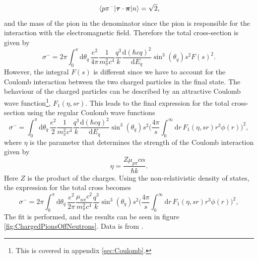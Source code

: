\begin{equation} \label{isoceffigen}
	\mel*{p\pi^-}{\bm{\mathrm{\tau}}\cdot\bm{\mathrm{\pi}}}{n} = \sqrt{2},
\end{equation}
and the mass of the pion in the denominator since the pion is responsible for the interaction with the electromagnetic field. Therefore the total cross-section is given by
\begin{equation} \label{totcross4}
	\sigma^- =  2\pi \int_0^\pi \text{d}\theta_q \, \frac{e^2}{4\pi}\frac{1}{m_\pi^2c^4}\frac{q^3}{k}\frac{\text{d}(\hbar c q)^2}{\text{d}E_q}\sin^3(\theta_q) s^2 F(s)^2.
\end{equation}
However, the integral $F(s)$ is different since we have to account for the Coulomb interaction between the two charged particles in the final state. The behaviour of the charged particles can be described by an attractive Coulomb	wave function\footnote{This is covered in appendix \ref{sec:Coulomb}.}, $F_1(\eta, sr)$. This leads to the final expression for the total cross-section using the regular Coulomb wave functions
\begin{equation} \label{totcross5}
	\sigma^- =  \int_0^\pi \text{d}\theta_q \, \frac{e^2}{2}\frac{1}{m_\pi^2c^4}\frac{q^3}{k}\frac{\text{d}(\hbar c q)^2}{\text{d}E_q}\sin^3(\theta_q) s^2 \bigg(\frac{4\pi}{s} \int_0^\infty \text{d}r \, F_1(\eta,sr)r^3\phi(r)\bigg)^2,
\end{equation}
where $\eta$ is the parameter that determines the strength of the Coulomb interaction given by
\begin{equation} \label{etafunc}
	\eta = \frac{Z\mu_{p\pi}c\alpha}{\hbar k}.
\end{equation}
Here $Z$ is the product of the charges. Using the non-relativistic density of states, the expression for the total cross becomes
\begin{equation} \label{cross4nonrel}
	\sigma^-=  2\pi \int_0^\pi \text{d}\theta_q \, \frac{e^2}{2\pi}\frac{\mu_{n\pi}c^2}{m_\pi^2c^4}\frac{q^3}{k}\sin^3(\theta_q) s^2 \bigg(\frac{4\pi}{s} \int_0^\infty \text{d}r \, F_1(\eta,sr)r^3\phi(r)\bigg)^2,
\end{equation}
The fit is performed, and the results can be seen in figure \ref{fig:ChargedPionsOffNeutrons}. Data is from \cite{PionOffNeutron}.
